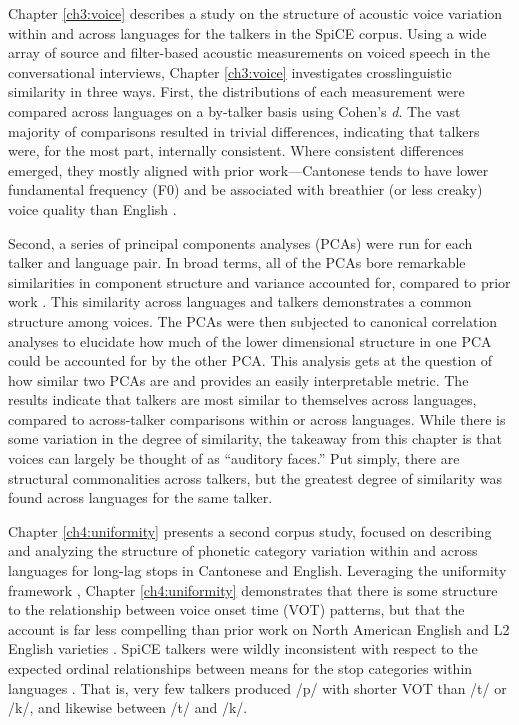 Chapter \ref{ch3:voice} describes a study on the structure of acoustic voice variation within and across languages for the talkers in the SpiCE corpus. Using a wide array of source and filter-based acoustic measurements on voiced speech in the conversational interviews, Chapter \ref{ch3:voice} investigates crosslinguistic similarity in three ways. First, the distributions of each measurement were compared across languages on a by-talker basis using Cohen's \textit{d}. The vast majority of comparisons resulted in trivial differences, indicating that talkers were, for the most part, internally consistent. Where consistent differences emerged, they mostly aligned with prior work---Cantonese tends to have lower fundamental frequency (F0) and be associated with breathier (or less creaky) voice quality than English \citep[cf.][]{ng_2012_ltas}. 

Second, a series of principal components analyses (PCAs) were run for each talker and language pair. In broad terms, all of the PCAs bore remarkable similarities in component structure and variance accounted for, compared to prior work \citep{lee_2019_acoustic, lee_2019_spontaneous, lee_2020_language}. This similarity across languages and talkers demonstrates a common structure among voices. The PCAs were then subjected to canonical correlation analyses to elucidate how much of the lower dimensional structure in one PCA could be accounted for by the other PCA. This analysis gets at the question of how similar two PCAs are and provides an easily interpretable metric. The results indicate that talkers are most similar to themselves across languages, compared to across-talker comparisons within or across languages. While there is some variation in the degree of similarity, the takeaway from this chapter is that voices can largely be thought of as ``auditory faces.'' Put simply, there are structural commonalities across talkers, but the greatest degree of similarity was found across languages for the same talker. 

Chapter \ref{ch4:uniformity} presents a second corpus study, focused on describing and analyzing the structure of phonetic category variation within and across languages for long-lag stops in Cantonese and English. Leveraging the uniformity framework \citep{chodroff_2017_structure}, Chapter \ref{ch4:uniformity} demonstrates that there is some structure to the relationship between voice onset time (VOT) patterns, but that the account is far less compelling than prior work on North American English \citep{chodroff_2017_structure} and L2 English varieties \citep{chodroff_2019_l2}. SpiCE talkers were wildly inconsistent with respect to the expected ordinal relationships between means for the stop categories within languages \citep{chodroff_2017_structure, cho_1999_vot, lisker_1964_vot}. That is, very few talkers produced /p/ with shorter VOT than /t/ or /k/, and likewise between /t/ and /k/. 

